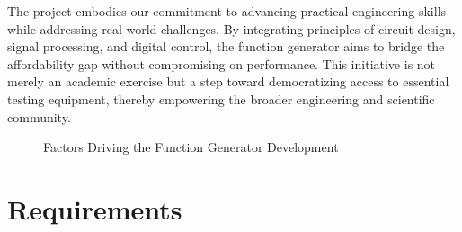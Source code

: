 \documentclass[a4paper,12pt]{article}
\begin{document}
The project embodies our commitment to advancing practical engineering skills while addressing real-world challenges. By integrating principles of circuit design, signal processing, and digital control, the function generator aims to bridge the affordability gap without compromising on performance. This initiative is not merely an academic exercise but a step toward democratizing access to essential testing equipment, thereby empowering the broader engineering and scientific community.

\begin{figure}[H]
    \centering 
    
    \caption{Factors Driving the Function Generator Development}
    \label{fig:motivation}
\end{figure}


\newpage
\section{Requirements}
\end{document}

